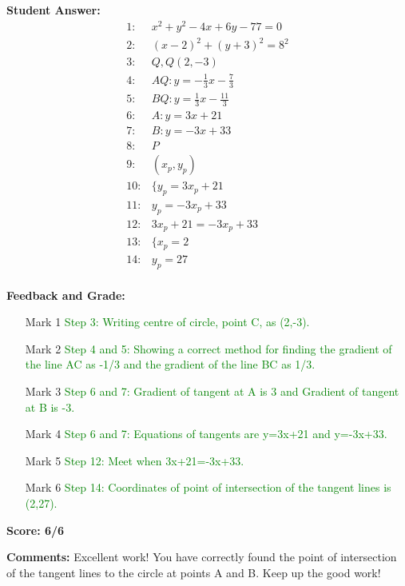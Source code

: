 \documentclass{article}
\begin{document}
\textbf{Student Answer:}
\begin{align*}
1: & x^2+y^2-4x+6y-77=0 \\
2: & (x-2)^2+(y+3)^2=8^2 \\
3: & Q,Q(2,-3) \\
4: & AQ:y=-\frac{1}{3}x-\frac{7}{3} \\
5: & BQ:y=\frac{1}{3}x-\frac{11}{3} \\
6: & A:y=3x+21 \\
7: & B:y=-3x+33 \\
8: & P \\
9: & (x_p,y_p) \\
10: & \{y_p=3x_p+21 \\
11: & y_p=-3x_p+33 \\
12: & 3x_p+21=-3x_p+33 \\
13: & \{x_p=2 \\
14: & y_p=27 \\
\end{align*}

\textbf{Feedback and Grade:}
\begin{itemize}
\item[Mark 1] \textcolor{green}{Step 3: Writing centre of circle, point C, as (2,-3).}
\item[Mark 2] \textcolor{green}{Step 4 and 5: Showing a correct method for finding the gradient of the line AC as -1/3 and the gradient of the line BC as 1/3.}
\item[Mark 3] \textcolor{green}{Step 6 and 7: Gradient of tangent at A is 3 and Gradient of tangent at B is -3.}
\item[Mark 4] \textcolor{green}{Step 6 and 7: Equations of tangents are y=3x+21 and y=-3x+33.}
\item[Mark 5] \textcolor{green}{Step 12: Meet when 3x+21=-3x+33.}
\item[Mark 6] \textcolor{green}{Step 14: Coordinates of point of intersection of the tangent lines is (2,27).}
\end{itemize}

\textbf{Score: 6/6}

\textbf{Comments:} Excellent work! You have correctly found the point of intersection of the tangent lines to the circle at points A and B. Keep up the good work!
\end{document}
